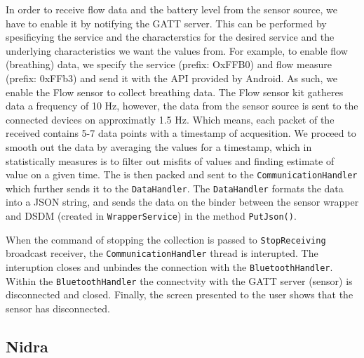 In order to receive flow data and the battery level from the sensor source, we have to enable it by notifying the GATT server. This can be performed by spesificying the service and the characterstics for the desired service and the underlying characteristics we want the values from. For example, to enable flow (breathing) data, we specify the service (prefix: OxFFB0) and flow measure (prefix: 0xFFb3) and send it with the API provided by Android.  As such, we enable the Flow sensor to collect breathing data. The Flow sensor kit gatheres data a frequency of 10 Hz, however, the data from the sensor source is sent to the connected devices on approximatly 1.5 Hz. Which means, each packet of the received contains 5-7 data points with a timestamp of acquesition. We proceed to smooth out the data by averaging the values for a timestamp, which in statistically measures is to filter out misfits of values and finding estimate of value on a given time. The is then packed and sent to the \verb|CommunicationHandler| which further sends it to the \verb|DataHandler|. The \verb|DataHandler| formats the data into a JSON string, and sends the data on the binder between the sensor wrapper and DSDM (created in \verb|WrapperService|) in the method \verb|PutJson()|. 

When the command of stopping the collection is passed to \verb|StopReceiving| broadcast receiver, the \verb|CommunicationHandler| thread is interupted. The interuption closes and unbindes the connection with the \verb|BluetoothHandler|. Within the \verb|BluetoothHandler| the connectvity with the GATT server (sensor) is disconnected and closed. Finally, the screen presented to the user shows that the sensor has disconnected.


\subsection{Nidra}

